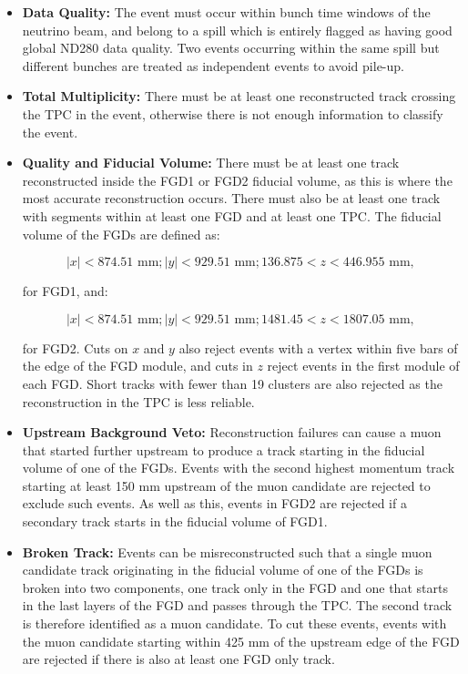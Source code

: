 \begin{itemize}

\item \textbf{Data Quality:} The event must occur within bunch time windows of the neutrino beam, and belong to a spill which is entirely flagged as having good global ND280 data quality. Two events occurring within the same spill but different bunches are treated as independent events to avoid pile-up.

\item \textbf{Total Multiplicity:} There must be at least one reconstructed track crossing the TPC in the event, otherwise there is not enough information to classify the event.

\item \textbf{Quality and Fiducial Volume:} There must be at least one track reconstructed inside the FGD1 or FGD2 fiducial volume, as this is where the most accurate reconstruction occurs. There must also be at least one track with segments within at least one FGD and at least one TPC. The fiducial volume of the FGDs are defined as:

\begin{equation}
|x| < 874.51 \textrm{ mm}; |y| < 929.51 \textrm{ mm}; 136.875 < z < 446.955 \textrm{ mm},
\end{equation}

for FGD1, and:

\begin{equation}
|x| < 874.51 \textrm{ mm}; |y| < 929.51 \textrm{ mm}; 1481.45 < z < 1807.05 \textrm{ mm},
\end{equation}

for FGD2. Cuts on $x$ and $y$ also reject events with a vertex within five bars of the edge of the FGD module, and cuts in $z$ reject events in the first module of each FGD. Short tracks with fewer than 19 clusters are also rejected as the reconstruction in the TPC is less reliable.

\item \textbf{Upstream Background Veto:} Reconstruction failures can cause a muon that started further upstream to produce a track starting in the fiducial volume of one of the FGDs. Events with the second highest momentum track starting at least 150 mm upstream of the muon candidate are rejected to exclude such events. As well as this, events in FGD2 are rejected if a secondary track starts in the fiducial volume of FGD1.

\item \textbf{Broken Track:} Events can be misreconstructed such that a single muon candidate track originating in the fiducial volume of one of the FGDs is broken into two components, one track only in the FGD and one that starts in the last layers of the FGD and passes through the TPC. The second track is therefore identified as a muon candidate. To cut these events, events with the muon candidate starting within 425 mm of the upstream edge of the FGD are rejected if there is also at least one FGD only track.


\end{itemize}
